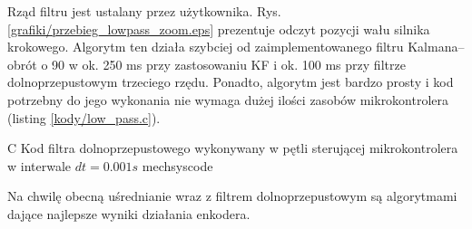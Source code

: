 Rząd filtru jest ustalany przez użytkownika. Rys. \ref{grafiki/przebieg_lowpass_zoom.eps} prezentuje odczyt pozycji wału silnika krokowego. Algorytm ten działa szybciej od zaimplementowanego filtru Kalmana-- obrót o 90\degree{} w ok. 250 ms przy zastosowaniu KF i ok. 100 ms przy filtrze dolnoprzepustowym trzeciego rzędu. Ponadto, algorytm jest bardzo prosty i kod potrzebny do jego wykonania nie wymaga dużej ilości zasobów mikrokontrolera (listing \ref{kody/low_pass.c}).

		   {C}
		   {Kod filtra dolnoprzepustowego wykonywany w pętli sterującej mikrokontrolera w interwale $ dt = 0.001 s $}
		   {mechsyscode}
		   
Na chwilę obecną uśrednianie wraz z  filtrem dolnoprzepustowym są algorytmami dające najlepsze wyniki działania enkodera.















